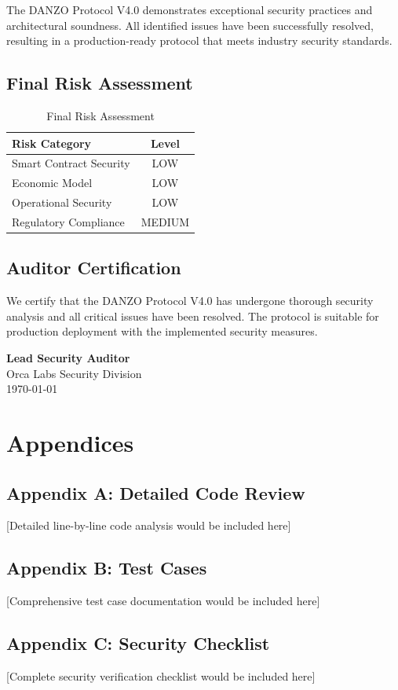 \documentclass[11pt,a4paper]{article}
\begin{document}
The DANZO Protocol V4.0 demonstrates exceptional security practices and architectural soundness. All identified issues have been successfully resolved, resulting in a production-ready protocol that meets industry security standards.

\subsection{Final Risk Assessment}
\begin{table}[H]
\centering
\begin{tabular}{@{}lc@{}}
\toprule
\textbf{Risk Category} & \textbf{Level} \\
\midrule
Smart Contract Security & \textcolor{danzoGreen}{LOW} \\
Economic Model & \textcolor{danzoGreen}{LOW} \\
Operational Security & \textcolor{danzoGreen}{LOW} \\
Regulatory Compliance & \textcolor{danzoGreen}{MEDIUM} \\
\bottomrule
\end{tabular}
\caption{Final Risk Assessment}
\end{table}

\subsection{Auditor Certification}
We certify that the DANZO Protocol V4.0 has undergone thorough security analysis and all critical issues have been resolved. The protocol is suitable for production deployment with the implemented security measures.

\vspace{2cm}

\noindent\textbf{Lead Security Auditor}\\
Orca Labs Security Division\\
\today

\section{Appendices}

\subsection{Appendix A: Detailed Code Review}
[Detailed line-by-line code analysis would be included here]

\subsection{Appendix B: Test Cases}
[Comprehensive test case documentation would be included here]

\subsection{Appendix C: Security Checklist}
[Complete security verification checklist would be included here]
\end{document}
